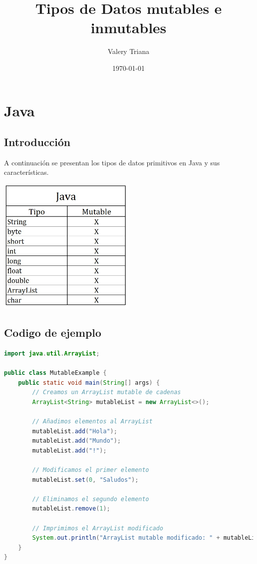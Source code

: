 \documentclass{article}
\title{Tipos de Datos mutables e inmutables}
\author{Valery Triana}
\date{\today} %
\begin{document}
\maketitle

\section{Java}

\subsection{Introducción}
A continuación se presentan los tipos de datos primitivos en Java y sus características.

\includegraphics[width=0.5\textwidth]{javaTabla.jpg} %

\subsection{Codigo de ejemplo}
\begin{lstlisting}[language=Java, caption=Ejemplo de código en Java]
import java.util.ArrayList;

public class MutableExample {
    public static void main(String[] args) {
        // Creamos un ArrayList mutable de cadenas
        ArrayList<String> mutableList = new ArrayList<>();
        
        // Añadimos elementos al ArrayList
        mutableList.add("Hola");
        mutableList.add("Mundo");
        mutableList.add("!");

        // Modificamos el primer elemento
        mutableList.set(0, "Saludos");

        // Eliminamos el segundo elemento
        mutableList.remove(1);

        // Imprimimos el ArrayList modificado
        System.out.println("ArrayList mutable modificado: " + mutableList);
    }
}


\end{lstlisting}
\end{document}
